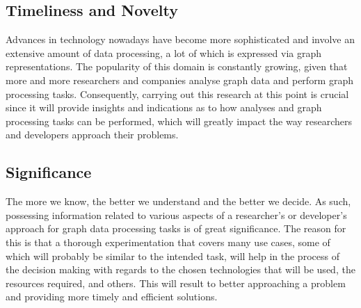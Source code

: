 \documentclass[a4paper,11pt]{article}
\begin{document}
\subsection{Timeliness and Novelty}

\par Advances in technology nowadays have become more sophisticated and involve an extensive amount of data processing, a lot of which is expressed via graph representations. The popularity of this domain is constantly growing, given that more and more researchers and companies analyse graph data and perform graph processing tasks. Consequently, carrying out this research at this point is crucial since it will provide insights and indications as to how analyses and graph processing tasks can be performed, which will greatly impact the way researchers and developers approach their problems.


\subsection{Significance}



\par The more we know, the better we understand and the better we decide. As such, possessing information related to various aspects of a researcher's or developer's approach for graph data processing tasks is of great significance. The reason for this is that a thorough experimentation that covers many use cases, some of which will probably be similar to the intended task, will help in the process of the decision making with regards to the chosen technologies that will be used, the resources required, and others. This will result to better approaching a problem and providing more timely and efficient solutions.


\end{document}
